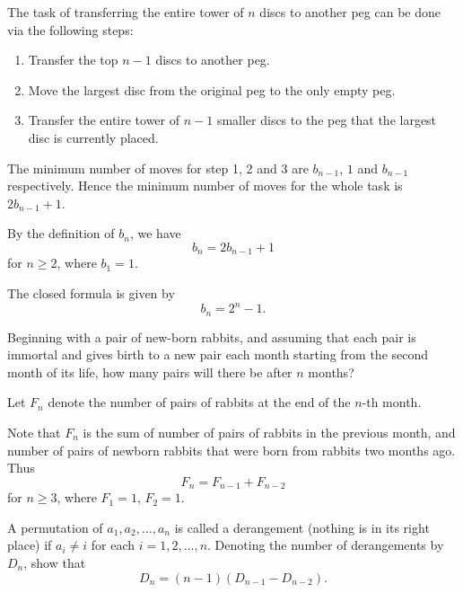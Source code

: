 \begin{solution}
The task of transferring the entire tower of $n$ discs to another peg can be done via the following steps:
\begin{enumerate}
\item Transfer the top $n-1$ discs to another peg.
\item Move the largest disc from the original peg to the only empty peg.
\item Transfer the entire tower of $n-1$ smaller discs to the peg that the largest disc is currently placed.
\end{enumerate}
The minimum number of moves for step 1, 2 and 3 are $b_{n-1}$, $1$ and $b_{n-1}$ respectively. Hence the minimum number of moves for the whole task is $2b_{n-1}+1$.

By the definition of $b_n$, we have
\[ b_n=2b_{n-1}+1 \]
for $n\ge2$, where $b_1=1$.

\begin{remark}
The closed formula is given by
\[ b_n=2^n-1. \]
\end{remark}
\end{solution}

\begin{example}
Beginning with a pair of new-born rabbits, and assuming that each pair is immortal and gives birth to a new pair each month starting from the second month of its life, how many pairs will there be after $n$ months?
\end{example}

\begin{solution}
Let $F_n$ denote the number of pairs of rabbits at the end of the $n$-th month.

Note that $F_n$ is the sum of number of pairs of rabbits in the previous month, and number of pairs of newborn rabbits that were born from rabbits two months ago. Thus
\[ F_n=F_{n-1}+F_{n-2} \]
for $n\ge3$, where $F_1=1$, $F_2=1$.
\end{solution}

\begin{example}[Derangement]
A permutation of $a_1,a_2,\dots,a_n$ is called a derangement (nothing is in its right place) if $a_i\neq i$ for each $i=1,2,\dots,n$. Denoting the number of derangements by $D_n$, show that
\[ D_n=(n-1)(D_{n-1}-D_{n-2}). \]
\end{example}

